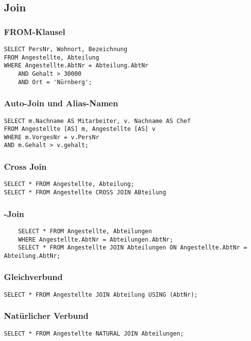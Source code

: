 \subsection{Join}
\subsubsection{FROM-Klausel}
\begin{verbatim}
SELECT PersNr, Wohnort, Bezeichnung
FROM Angestellte, Abteilung
WHERE Angestellte.AbtNr = Abteilung.AbtNr 
	AND Gehalt > 30000
	AND Ort = 'Nürnberg';
\end{verbatim}
\subsubsection{Auto-Join und Alias-Namen}
\begin{verbatim}
SELECT m.Nachname AS Mitarbeiter, v. Nachname AS Chef
FROM Angestellte [AS] m, Angestellte [AS] v
WHERE m.VorgesNr = v.PersNr
AND m.Gehalt > v.gehalt;
\end{verbatim}
\subsubsection{Cross Join}
\begin{verbatim}
SELECT * FROM Angestellte, Abteilung;
SELECT * FROM Angestellte CROSS JOIN ABteilung
\end{verbatim}
\subsubsection{\Theta-Join}
\begin{verbatim}
	SELECT * FROM Angestellte, Abteilungen
	WHERE Angestellte.AbtNr = Abteilungen.AbtNr;
	SELECT * FROM Angestellte JOIN Abteilungen ON Angestellte.AbtNr = Abteilung.AbtNr;
\end{verbatim}
\subsubsection{Gleichverbund}
\begin{verbatim}
SELECT * FROM Angestellte JOIN Abteilung USING (AbtNr);
\end{verbatim}
\subsubsection{Natürlicher Verbund}
\begin{verbatim}
SELECT * FROM Angestellte NATURAL JOIN Abteilungen;
\end{verbatim}
